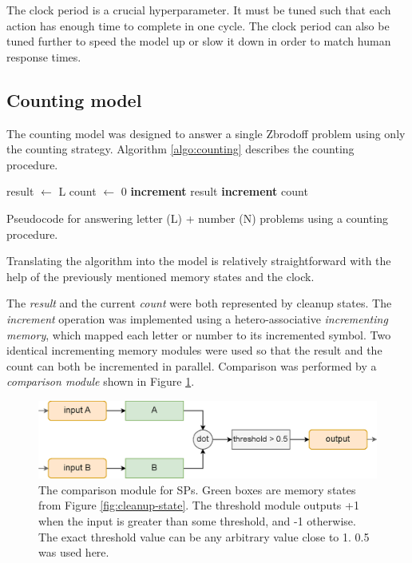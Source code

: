 \documentclass[10pt, a4paper, twocolumn]{article}
\begin{document}
The clock period is a crucial hyperparameter. It must be tuned such that each action has enough time to complete in one cycle. The clock period can also be tuned further to speed the model up or slow it down in order to match human response times.

\subsection{Counting model}

The counting model was designed to answer a single Zbrodoff problem using only the counting strategy. Algorithm \ref{algo:counting} describes the counting procedure.

\begin{algorithm}[h]
	\begin{algorithmic}
		\State result $\gets$ L
		\State count $\gets$ 0
			\State \textbf{increment} result
			\State \textbf{increment} count
		\EndWhile
	\end{algorithmic}
	\caption{Pseudocode for answering letter (L) + number (N) problems using a counting procedure.}
	\label{algo:counting}
\end{algorithm}

Translating the algorithm into the model is relatively straightforward with the help of the previously mentioned memory states and the clock. 

The \emph{result} and the current \emph{count} were both represented by cleanup states. The \emph{increment} operation was implemented using a hetero-associative \emph{incrementing memory}, which mapped each letter or number to its incremented symbol. Two identical incrementing memory modules were used so that the result and the count can both be incremented in parallel. Comparison was performed by a \emph{comparison module} shown in Figure \ref{fig:comparison-module}.

\begin{figure}[h]
	\centering
	\includegraphics[width=0.9\linewidth]{figures/comparison-module.eps}
	\caption{The comparison module for SPs. Green boxes are memory states from Figure \ref{fig:cleanup-state}. The threshold module outputs +1 when the input is greater than some threshold, and -1 otherwise. The exact threshold value can be any arbitrary value close to 1. 0.5 was used here.}
	\label{fig:comparison-module}
\end{figure}
\end{document}

